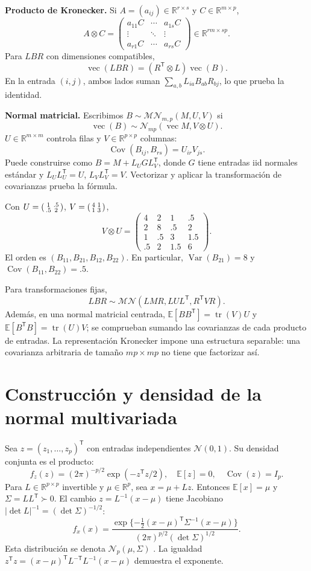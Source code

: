 \documentclass[11pt,a4paper]{article}
\newcommand{\R}{\mathbb R}
\newcommand{\E}{\mathbb E}
\newcommand{\T}{^{\mathsf T}}
\newcommand{\abs}[1]{\left\lvert #1\right\rvert}
\DeclareMathOperator{\Var}{Var}
\DeclareMathOperator{\Cov}{Cov}
\DeclareMathOperator{\tr}{tr}
\DeclareMathOperator{\vecop}{vec}
\newcommand{\Normal}{\mathcal N}
\newcommand{\topic}[2]{\clearpage\section{#1}\label{#2}}
\theoremstyle{definition}\newtheorem{definicion}[teorema]{Definición}
\begin{document}
\textbf{Producto de Kronecker.}
Si $A=(a_{ij})\in\R^{r\times s}$ y $C\in\R^{m\times p}$,
\[
A\otimes C=
\begin{pmatrix}a_{11}C&\cdots&a_{1s}C\\
\vdots&\ddots&\vdots\\a_{r1}C&\cdots&a_{rs}C\end{pmatrix}
\in\R^{rm\times sp}.
\]
Para $LBR$ con dimensiones compatibles,
\[
\boxed{\vecop(LBR)=(R\T\otimes L)\vecop(B)}.
\]
En la entrada $(i,j)$, ambos lados suman
$\sum_{a,b}L_{ia}B_{ab}R_{bj}$, lo que prueba la identidad.

\textbf{Normal matricial.}
Escribimos $B\sim\mathcal{MN}_{m,p}(M,U,V)$ si
\[
\vecop(B)\sim\Normal_{mp}(\vecop M,V\otimes U).
\]
$U\in\R^{m\times m}$ controla filas y $V\in\R^{p\times p}$ columnas:
\[
\Cov(B_{ij},B_{rs})=U_{ir}V_{js}.
\]
Puede construirse como $B=M+L_U G L_V\T$, donde $G$ tiene entradas
iid normales estándar y $L_UL_U\T=U$, $L_VL_V\T=V$.
Vectorizar y aplicar la transformación de covarianzas prueba la fórmula.

\begin{ejemplo}
Con $U=\begin{psmallmatrix}1&.5\\.5&2\end{psmallmatrix}$,
$V=\begin{psmallmatrix}4&1\\1&3\end{psmallmatrix}$,
\[
V\otimes U=
\begin{pmatrix}
4&2&1&.5\\2&8&.5&2\\1&.5&3&1.5\\.5&2&1.5&6
\end{pmatrix}.
\]
El orden es $(B_{11},B_{21},B_{12},B_{22})$.
En particular, $\Var(B_{21})=8$ y $\Cov(B_{11},B_{22})=.5$.
\end{ejemplo}
Para transformaciones fijas,
\[
LBR\sim\mathcal{MN}(LMR,LUL\T,R\T VR).
\]
Además, en una normal matricial centrada,
$\E[BB\T]=\tr(V)U$ y $\E[B\T B]=\tr(U)V$;
se comprueban sumando las covarianzas de cada producto de entradas.
La representación Kronecker impone una estructura separable:
una covarianza arbitraria de tamaño $mp\times mp$ no tiene que factorizar así.

\topic{Construcción y densidad de la normal multivariada}{s19}
Sea $z=(z_1,\ldots,z_p)\T$ con entradas independientes
$\Normal(0,1)$. Su densidad conjunta es el producto:
\[
f_z(z)=(2\pi)^{-p/2}\exp(-z\T z/2),\quad
\E[z]=0,\quad \Cov(z)=I_p.
\]
Para $L\in\R^{p\times p}$ invertible y $\mu\in\R^p$, sea $x=\mu+Lz$.
Entonces $\E[x]=\mu$ y $\Sigma=LL\T\succ0$.
El cambio $z=L^{-1}(x-\mu)$ tiene Jacobiano
$\abs{\det L}^{-1}=(\det\Sigma)^{-1/2}$:
\[
\boxed{
f_x(x)=\frac{\exp\{-\tfrac12(x-\mu)\T\Sigma^{-1}(x-\mu)\}}
{(2\pi)^{p/2}(\det\Sigma)^{1/2}}
}.
\]
Esta distribución se denota $\Normal_p(\mu,\Sigma)$ \cite{mitnormal}.
La igualdad
$z\T z=(x-\mu)\T L^{-\mathsf T}L^{-1}(x-\mu)$ demuestra el exponente.
\end{document}
